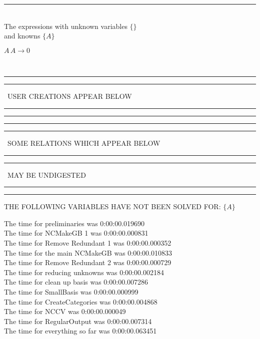 \documentclass[rep10,leqno]{report}
\begin{document}
\rule[3pt]{6in}{.7pt}\\
The expressions with unknown variables $\{\}$\\
and knowns $\{A\}$\smallskip\\
\begin{minipage}{6in}
$
A\,
 A\rightarrow 0
$
\end{minipage}\\
\rule[2pt]{6in}{1pt}\hfil\break
\rule[2.5pt]{1.701in}{1pt}
\ USER CREATIONS APPEAR BELOW\ 
\rule[2.5pt]{1.701in}{1pt}\hfil\break
\rule[2pt]{6in}{1pt}\hfil\break
\rule[2pt]{6in}{4pt}\hfil\break
\rule[2pt]{1.45in}{4pt}
\ SOME RELATIONS WHICH APPEAR BELOW\ 
\rule[2pt]{1.45in}{4pt}\hfil\break
\rule[2pt]{2.18in}{4pt}
\ MAY BE UNDIGESTED\ 
\rule[2pt]{2.18in}{4pt}\hfil\break
\rule[2pt]{6in}{4pt}\hfil\break
THE FOLLOWING VARIABLES HAVE NOT BEEN SOLVED FOR:\hfil\break
$\{A\}$
\smallskip\\
\vspace{10pt}

\noindent
The time for preliminaries was 0:00:00.019690\\
The time for NCMakeGB 1 was 0:00:00.000831\\
The time for Remove Redundant 1 was 0:00:00.000352\\
The time for the main NCMakeGB was 0:00:00.010833\\
The time for Remove Redundant 2 was 0:00:00.000729\\
The time for reducing unknowns was 0:00:00.002184\\
The time for clean up basis was 0:00:00.007286\\
The time for SmallBasis was 0:00:00.000999\\
The time for CreateCategories was 0:00:00.004868\\
The time for NCCV was 0:00:00.000049\\
The time for RegularOutput was 0:00:00.007314\\
The time for everything so far was 0:00:00.063451\\
\end{document}
